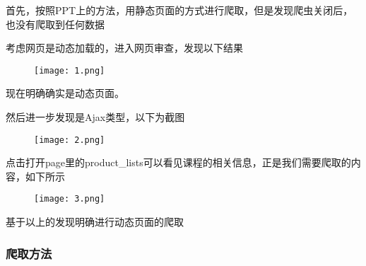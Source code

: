 \documentclass[lang=cn,11pt,a4paper]{elegantpaper}
\begin{document}
首先，按照PPT上的方法，用静态页面的方式进行爬取，但是发现爬虫关闭后，也没有爬取到任何数据

考虑网页是动态加载的，进入网页审查，发现以下结果
\clearpage

\begin{figure}[!htb]
\centering
\texttt{[image: 1.png]}
\end{figure}

现在明确确实是动态页面。

然后进一步发现是Ajax类型，以下为截图

\begin{figure}[!htb]
\centering
\texttt{[image: 2.png]}
\end{figure}

点击打开page里的product\_lists可以看见课程的相关信息，正是我们需要爬取的内容，如下所示
\clearpage

\begin{figure}[!htb]
\centering
\texttt{[image: 3.png]}
\end{figure}

基于以上的发现明确进行动态页面的爬取

\subsubsection{爬取方法}
\end{document}
